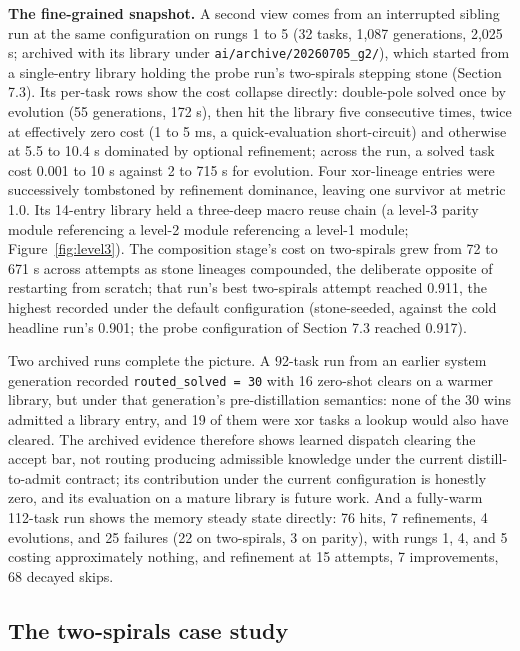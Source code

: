 \documentclass[11pt]{article}
\begin{document}
\textbf{The fine-grained snapshot.} A second view comes from an interrupted sibling run at the same configuration on rungs 1 to 5 (32 tasks, 1,087 generations, 2,025 s; archived with its library under \texttt{ai/archive/20260705_g2/}), which started from a single-entry library holding the probe run's two-spirals stepping stone (Section 7.3). Its per-task rows show the cost collapse directly: double-pole solved once by evolution (55 generations, 172 s), then hit the library five consecutive times, twice at effectively zero cost (1 to 5 ms, a quick-evaluation short-circuit) and otherwise at 5.5 to 10.4 s dominated by optional refinement; across the run, a solved task cost 0.001 to 10 s against 2 to 715 s for evolution. Four xor-lineage entries were successively tombstoned by refinement dominance, leaving one survivor at metric 1.0. Its 14-entry library held a three-deep macro reuse chain (a level-3 parity module referencing a level-2 module referencing a level-1 module; Figure~\ref{fig:level3}). The composition stage's cost on two-spirals grew from 72 to 671 s across attempts as stone lineages compounded, the deliberate opposite of restarting from scratch; that run's best two-spirals attempt reached 0.911, the highest recorded under the default configuration (stone-seeded, against the cold headline run's 0.901; the probe configuration of Section 7.3 reached 0.917).

Two archived runs complete the picture. A 92-task run from an earlier system generation recorded \texttt{routed_solved = 30} with 16 zero-shot clears on a warmer library, but under that generation's pre-distillation semantics: none of the 30 wins admitted a library entry, and 19 of them were xor tasks a lookup would also have cleared. The archived evidence therefore shows learned dispatch clearing the accept bar, not routing producing admissible knowledge under the current distill-to-admit contract; its contribution under the current configuration is honestly zero, and its evaluation on a mature library is future work. And a fully-warm 112-task run shows the memory steady state directly: 76 hits, 7 refinements, 4 evolutions, and 25 failures (22 on two-spirals, 3 on parity), with rungs 1, 4, and 5 costing approximately nothing, and refinement at 15 attempts, 7 improvements, 68 decayed skips.

\subsection{The two-spirals case study}
\end{document}
